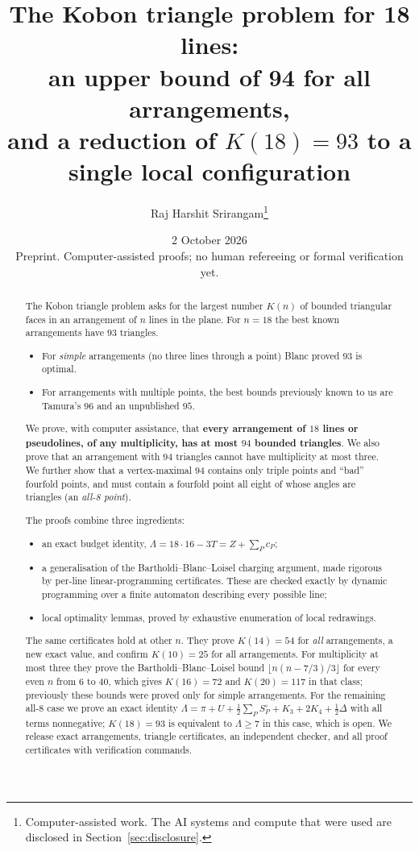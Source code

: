 \documentclass[11pt]{article}
\title{The Kobon triangle problem for 18 lines:\\
an upper bound of 94 for all arrangements,\\
and a reduction of $K(18)=93$ to a single local configuration}
\author{Raj Harshit Srirangam\thanks{Computer-assisted work. The AI systems and compute that were used are disclosed in Section~\ref{sec:disclosure}.}}
\date{2 October 2026 \\ \small Preprint. Computer-assisted proofs; no human refereeing or formal verification yet.}
\theoremstyle{definition}
\theoremstyle{remark}
\newcommand{\Lam}{\Lambda}
\begin{document}
\maketitle

\begin{abstract}
The Kobon triangle problem asks for the largest number $K(n)$ of bounded triangular faces in an arrangement of $n$
lines in the plane. For $n=18$ the best known arrangements have $93$ triangles.
\begin{itemize}[nosep]
\item For \emph{simple} arrangements (no three lines through a point) Blanc proved $93$ is optimal.
\item For arrangements with multiple points, the best bounds previously known to us are Tamura's $96$ and an
unpublished $95$.
\end{itemize}
We prove, with computer assistance, that \textbf{every arrangement of $18$ lines or pseudolines, of any
multiplicity, has at most $94$ bounded triangles}. We also prove that an arrangement with $94$ triangles cannot
have multiplicity at most three. We further show that a vertex-maximal $94$ contains only triple points and
``bad'' fourfold points, and must contain a fourfold point all eight of whose angles are triangles (an
\emph{all-8 point}).

The proofs combine three ingredients:
\begin{itemize}[nosep]
\item an exact budget identity, $\Lam = 18\cdot 16-3T = Z+\sum_P c_P$;
\item a generalisation of the Bartholdi--Blanc--Loisel charging argument, made rigorous by per-line linear-programming
certificates. These are checked exactly by dynamic programming over a finite automaton describing every possible line;
\item local optimality lemmas, proved by exhaustive enumeration of local redrawings.
\end{itemize}
The same certificates hold at other $n$. They prove $K(14)=54$ for \emph{all} arrangements, a new exact value, and
confirm $K(10)=25$ for all arrangements. For
multiplicity at most three they prove the Bartholdi--Blanc--Loisel bound $\lfloor n(n-7/3)/3\rfloor$ for every even $n$
from $6$ to $40$, which gives $K(16)=72$ and $K(20)=117$ in that class; previously these bounds were proved only for
simple arrangements.
For the remaining all-8 case we prove an exact identity
$\Lam=\pi+U+\tfrac12\sum_P S^\circ_P+K_3+2K_4+\tfrac12\Delta$ with all terms nonnegative; $K(18)=93$ is equivalent
to $\Lam\ge 7$ in this case, which is open. We release exact arrangements, triangle certificates, an independent checker,
and all proof certificates with verification commands.
\end{abstract}
\end{document}
